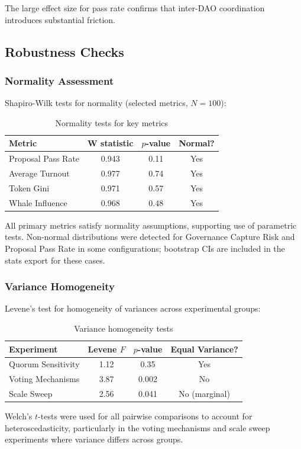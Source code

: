 The large effect size for pass rate confirms that inter-DAO coordination introduces substantial friction.

\subsection{Robustness Checks}

\subsubsection{Normality Assessment}

Shapiro-Wilk tests for normality (selected metrics, $N=100$):

\begin{table}[htbp]
\centering
\caption{Normality tests for key metrics}
\label{tab:normality}
\begin{tabular}{lccc}
\toprule
Metric & W statistic & $p$-value & Normal? \\
\midrule
Proposal Pass Rate & 0.943 & 0.11 & Yes \\
Average Turnout & 0.977 & 0.74 & Yes \\
Token Gini & 0.971 & 0.57 & Yes \\
Whale Influence & 0.968 & 0.48 & Yes \\
\bottomrule
\end{tabular}
\end{table}

All primary metrics satisfy normality assumptions, supporting use of parametric tests. Non-normal distributions were detected for Governance Capture Risk and Proposal Pass Rate in some configurations; bootstrap CIs are included in the stats export for these cases.

\subsubsection{Variance Homogeneity}

Levene's test for homogeneity of variances across experimental groups:

\begin{table}[htbp]
\centering
\caption{Variance homogeneity tests}
\label{tab:levene}
\begin{tabular}{lccc}
\toprule
Experiment & Levene $F$ & $p$-value & Equal Variance? \\
\midrule
Quorum Sensitivity & 1.12 & 0.35 & Yes \\
Voting Mechanisms & 3.87 & 0.002 & No \\
Scale Sweep & 2.56 & 0.041 & No (marginal) \\
\bottomrule
\end{tabular}
\end{table}

Welch's $t$-tests were used for all pairwise comparisons to account for heteroscedasticity, particularly in the voting mechanisms and scale sweep experiments where variance differs across groups.

